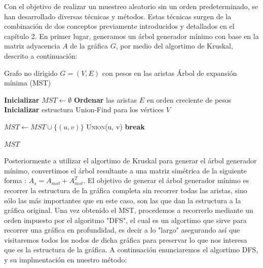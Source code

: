 Con el objetivo de realizar un muestreo aleatorio sin un orden predeterminado, se han desarrollado diversas técnicas y métodos. Estas técnicas surgen de la combinación de dos conceptos previamente introducidos y detallados en el capítulo 2.
En primer lugar, generamos un árbol generador mínimo con base en la matriz adyacencia $A$ de la gráfica $G$, por medio del algortimo de Kruskal, descrito a continuación:

\begin{algorithm}[H]
\caption{Algoritmo de Kruskal para el Árbol de Expansión Mínima (MST)}
\label{alg:kruskal}
\begin{algorithmic}[1]
\Require Grafo no dirigido \( G = (V, E) \) con pesos en las aristas
\Ensure Árbol de expansión mínima (MST)

\State \textbf{Inicializar} \( MST \gets \emptyset \) 
\State \textbf{Ordenar} las aristas \( E \) en orden creciente de pesos
\State \textbf{Inicializar} estructura Union-Find para los vértices \( V \)

     
        \State \( MST \gets MST \cup \{(u, v)\} \) 
        \State \textsc{Union}(u, v) 
    \EndIf
     
        \State \textbf{break}
    \EndIf
\EndFor

\State \Return \( MST \) 
\end{algorithmic}
\end{algorithm}

Posteriormente a utilizar el algortimo de Kruskal para generar el árbol generador mínimo, convertimos el árbol resultante a una matriz simétrica de la siguiente forma : $A_{s} = A_{mst} + A_{mst}^T $.
El objetivo de generar el árbol generador mínimo es recorrer la estructura de la gráfica completa sin recorrer todas las aristas, sino sólo las más importantes que en este caso, son las que dan la estructura a la gráfica original.
Una vez obtenido el MST, procedemos a recorrerlo mediante un orden impuesto por el algoritmo "DFS", el cual es un algortimo que sirve para recorrer una gráfica en profundidad, es decir a lo "largo" asegurando así que visitaremos todos los nodos de dicha gráfica para preservar lo que nos interesa que es la estructura de la gráfica.
A continuación enunciaremos el algortimo DFS, y su implmentación en nuestro método:

